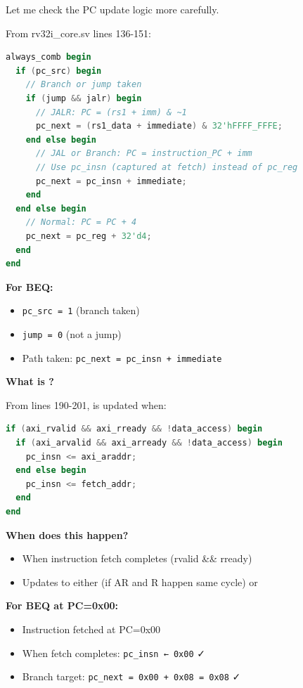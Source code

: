 \begin{record}

Let me check the PC update logic more carefully.

From rv32i\_\allowbreak{}core.sv lines 136-151:

\begin{lstlisting}[language=Verilog]
always_comb begin
  if (pc_src) begin
    // Branch or jump taken
    if (jump && jalr) begin
      // JALR: PC = (rs1 + imm) & ~1
      pc_next = (rs1_data + immediate) & 32'hFFFF_FFFE;
    end else begin
      // JAL or Branch: PC = instruction_PC + imm
      // Use pc_insn (captured at fetch) instead of pc_reg
      pc_next = pc_insn + immediate;
    end
  end else begin
    // Normal: PC = PC + 4
    pc_next = pc_reg + 32'd4;
  end
end
\end{lstlisting}

\textbf{For BEQ:}

\begin{itemize}
\tightlist
\item
  \texttt{pc\_\allowbreak{}src\ =\allowbreak{}\ 1} (branch taken)
\item
  \texttt{jump\ =\allowbreak{}\ 0} (not a jump)
\item
  Path taken:
  \texttt{pc\_\allowbreak{}next\ =\allowbreak{}\ pc\_\allowbreak{}insn\ +\allowbreak{}\ immediate}
\end{itemize}

\textbf{What is ?}

From lines 190-201,  is updated when:

\begin{lstlisting}[language=Verilog]
if (axi_rvalid && axi_rready && !data_access) begin
  if (axi_arvalid && axi_arready && !data_access) begin
    pc_insn <= axi_araddr;
  end else begin
    pc_insn <= fetch_addr;
  end
end
\end{lstlisting}

\textbf{When does this happen?}

\begin{itemize}
\tightlist
\item
  When instruction fetch completes (rvalid \&\& rready)
\item
  Updates to either  (if AR and R happen same cycle) or
\end{itemize}

\textbf{For BEQ at PC=0x00:}

\begin{itemize}
\tightlist
\item
  Instruction fetched at PC=0x00
\item
  When fetch completes: \texttt{pc\_\allowbreak{}insn\ ←\ 0x00} ✓
\item
  Branch target:
  \texttt{pc\_\allowbreak{}next\ =\allowbreak{}\ 0x00\ +\allowbreak{}\ 0x08\ =\allowbreak{}\ 0x08}
  ✓
\end{itemize}


\end{record}
